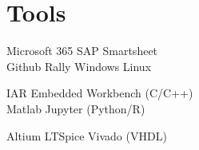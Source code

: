 \section{Tools}


	Microsoft 365 \textbullet{} SAP \textbullet{} Smartsheet\\
	Github \textbullet{} Rally \textbullet{} Windows \textbullet{} Linux
	
\vspace{\topsep}

		IAR Embedded Workbench (C/C++)\\ 
		Matlab \textbullet{} Jupyter (Python/R)
		
		 Altium \textbullet{} LTSpice \textbullet{} Vivado (VHDL)

